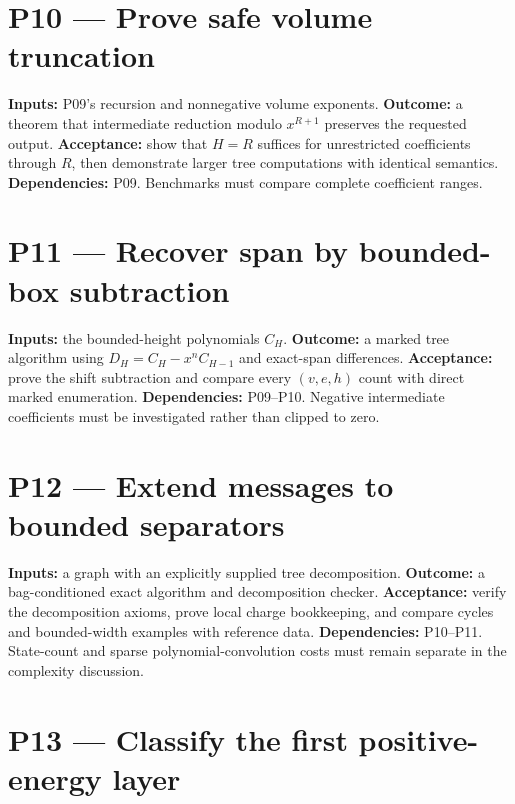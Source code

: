\documentclass[
  11pt,
  a4paper,
]{report}
\begin{document}
\hypertarget{p10-prove-safe-volume-truncation}{%
\section{P10 --- Prove safe volume
truncation}\label{p10-prove-safe-volume-truncation}}

\textbf{Inputs:} P09's recursion and nonnegative volume exponents.
\textbf{Outcome:} a theorem that intermediate reduction modulo
\(x^{R+1}\) preserves the requested output. \textbf{Acceptance:} show
that \(H=R\) suffices for unrestricted coefficients through \(R\), then
demonstrate larger tree computations with identical semantics.
\textbf{Dependencies:} P09. Benchmarks must compare complete coefficient
ranges.

\hypertarget{p11-recover-span-by-bounded-box-subtraction}{%
\section{P11 --- Recover span by bounded-box
subtraction}\label{p11-recover-span-by-bounded-box-subtraction}}

\textbf{Inputs:} the bounded-height polynomials \(C_H\).
\textbf{Outcome:} a marked tree algorithm using \(D_H=C_H-x^nC_{H-1}\)
and exact-span differences. \textbf{Acceptance:} prove the shift
subtraction and compare every \((v,e,h)\) count with direct marked
enumeration. \textbf{Dependencies:} P09--P10. Negative intermediate
coefficients must be investigated rather than clipped to zero.

\hypertarget{p12-extend-messages-to-bounded-separators}{%
\section{P12 --- Extend messages to bounded
separators}\label{p12-extend-messages-to-bounded-separators}}

\textbf{Inputs:} a graph with an explicitly supplied tree decomposition.
\textbf{Outcome:} a bag-conditioned exact algorithm and decomposition
checker. \textbf{Acceptance:} verify the decomposition axioms, prove
local charge bookkeeping, and compare cycles and bounded-width examples
with reference data. \textbf{Dependencies:} P10--P11. State-count and
sparse polynomial-convolution costs must remain separate in the
complexity discussion.

\hypertarget{p13-classify-the-first-positive-energy-layer}{%
\section{P13 --- Classify the first positive-energy
layer}\label{p13-classify-the-first-positive-energy-layer}}
\end{document}
